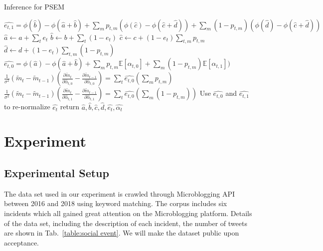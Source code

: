 \documentclass[runningheads]{llncs}
\newcommand{\Ep}{\mathbb{E}}
\begin{document}
\vspace{-0.6cm}
\begin{algorithm}\label{alg:Iterations}
\caption{Inference for PSEM}
\begin{algorithmic}
\STATE $\hat{e_{t,1}} = \phi(\hat{b})-\phi(\hat{a}+\hat{b}) + \sum_{m}  p_{t,m} (\phi(\hat{c})-\phi(\hat{c}+\hat{d})) +\sum_m (1-p_{t,m}) (\phi(\hat{d})-\phi(\hat{c}+\hat{d}))$\;
\STATE $\hat{a} \leftarrow  a+ \sum_{t} e_{t}$\;
\STATE $\hat{b}  \leftarrow  b+ \sum_{t} (1-e_{t})$\;
\STATE $\hat{c}  \leftarrow  c+ (1-e_{t}) \sum_{t,m} p_{t,m}$\;
\STATE $\hat{d}  \leftarrow  d+ (1-e_{t}) \sum_{t,m} (1-p_{t,m})$\;
\STATE $\hat{e_{t,0}}=\phi(\hat{a})-\phi(\hat{a}+\hat{b}) + \sum_{m}  p_{t,m}   \Ep[\alpha_{t,0}] +\sum_m (1-p_{t,m}) \Ep[\alpha_{t,1}])$\;
\STATE $\frac{1}{\sigma^2}(\widetilde{m}_{t}-\widetilde{m}_{t-1})(\frac{\partial \widetilde{m}_{t}}{\partial \hat{\alpha}_{t,0}}-\frac{\partial \widetilde{m}_{t-1}}{\partial \hat{\alpha}_{t,0}}) = \sum_t \hat{e_{t,0}} (\sum_m p_{t,m})$
\STATE $\frac{1}{\sigma^2}(\widetilde{m}_{t}-\widetilde{m}_{t-1})(\frac{\partial \widetilde{m}_{t}}{\partial \hat{\alpha}_{t,1}}-\frac{\partial \widetilde{m}_{t-1}}{\partial \hat{\alpha}_{t,1}}) = \sum_t \hat{e_{t,0}} (\sum_m (1-p_{t,m}))$
\ENDWHILE\;
Use $\hat{e_{t,0}}$ and $\hat{e_{t,1}}$ to re-normalize $\hat{e_{t}}$\;
return $\hat{a},\hat{b},\hat{c},\hat{d},\hat{e_{t}},\hat{\alpha_{t}}$
\end{algorithmic}
\end{algorithm}
\vspace{-0.6cm}




\section{Experiment}\label{sec:Experiment}
\subsection{Experimental Setup}
The data set used in our experiment is crawled through Microblogging API between 2016 and 2018 using keyword matching. The corpus includes six incidents which all gained great attention on the Microblogging platform. Details of the data set, including the description of each incident, the number of tweets are shown in Tab.~\ref{table:social event}. We will make the dataset public upon acceptance.
\end{document}
